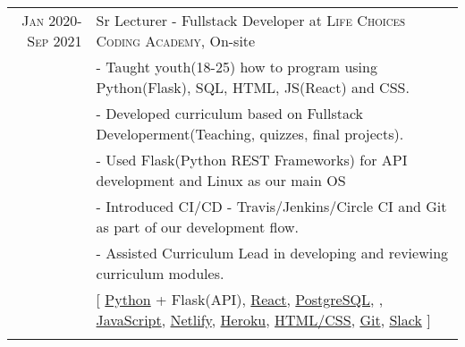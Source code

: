 \documentclass[a4paper,10pt]{article} %
\begin{document}
\begin{tabular}{r|p{15cm}}

\textsc{Jan 2020-Sep 2021} & Sr Lecturer - Fullstack Developer at \textsc{Life Choices Coding Academy}, On-site \emph{}\\
& \footnotesize{- Taught youth(18-25) how to program using  Python(Flask), SQL, HTML, JS(React) and CSS.}\\
& \footnotesize{- Developed curriculum based on Fullstack Developerment(Teaching, quizzes, final projects).}\\
& \footnotesize{- Used Flask(Python REST Frameworks) for API development and Linux as our main OS}\\
& \footnotesize{- Introduced CI/CD - Travis/Jenkins/Circle CI and Git as part of our development flow.}\\
& \footnotesize{- Assisted Curriculum Lead in developing and reviewing curriculum modules.}\\
& \footnotesize{[ \href{https://www.python.org/}{Python} + Flask(API), \href{https://react.dev/}{React}, \href{https://www.postgresql.org/}{PostgreSQL}, \href{}{}, \href{https://developer.mozilla.org/en-US/docs/Web/JavaScript}{JavaScript}, \href{https://www.netlify.com/}{Netlify}, \href{https://www.heroku.com/}{Heroku}, \href{https://datatracker.ietf.org/doc/html/rfc7993}{HTML/CSS}, \href{https://git-scm.com/}{Git}, \href{https://slack.com/}{Slack} ]}\\
\multicolumn{2}{c}{} \\



\end{tabular}
\end{document}
